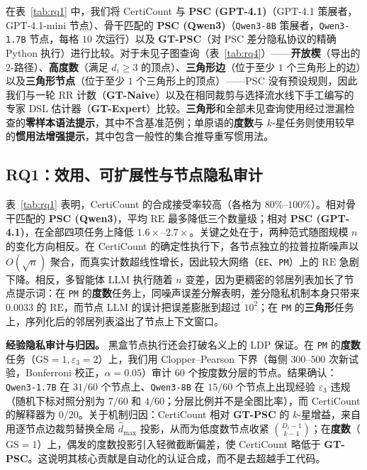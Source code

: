 \documentclass[11pt]{article}
\newlength{\zhindent}
\newcommand{\parhead}[1]{\par\noindent\hspace*{\zhindent}\textbf{#1}}
\theoremstyle{ieeeitalic}
\newcommand{\GS}{\mathrm{GS}}
\newcommand{\dhatmax}{\hat{d}_{\max}}
\newcommand{\RE}{\mathrm{RE}}
\begin{document}
在表~\ref{tab:rq1} 中，我们将 CertiCount 与 \textbf{PSC (GPT-4.1)}\cite{zhang2026psc}（GPT-4.1 策展者，GPT-4.1-mini 节点）、骨干匹配的 \textbf{PSC (Qwen3)}（\texttt{Qwen3-8B} 策展者，\texttt{Qwen3-1.7B} 节点，每格 $10$ 次运行）以及 \textbf{GT-PSC}（对 PSC 差分隐私协议的精确 Python 执行）进行比较。对于未见子图查询（表~\ref{tab:rq4}）——\textbf{开放楔}（导出的 $2$-路径）、\textbf{高度数}（满足 $d_i \ge 3$ 的顶点）、\textbf{三角形边}（位于至少 $1$ 个三角形上的边）以及\textbf{三角形节点}（位于至少 $1$ 个三角形上的顶点）——PSC 没有预设规则，因此我们与一轮 RR 计数（\textbf{GT-Naive}）以及在相同裁剪与选择流水线下手工编写的专家 DSL 估计器（\textbf{GT-Expert}）比较。\textbf{三角形}和全部未见查询使用经过泄漏检查的\textbf{零样本语法提示}，其中不含基准范例；单原语的\textbf{度数}与 $k$-星任务则使用较早的\textbf{惯用法增强提示}，其中包含一般性的集合推导重写惯用法。

\subsection{RQ1：效用、可扩展性与节点隐私审计}
\label{sec:rq1}

表~\ref{tab:rq1} 表明，CertiCount 的合成接受率较高（各格为 $80\%$--$100\%$）。相对骨干匹配的 \textbf{PSC (Qwen3)}，平均 $\RE$ 最多降低三个数量级；相对 \textbf{PSC (GPT-4.1)}，在全部四项任务上降低 $1.6\times$--$2.7\times$。关键之处在于，两种范式随图规模 $n$ 的变化方向相反。在 CertiCount 的确定性执行下，各节点独立的拉普拉斯噪声以 $O(\sqrt{n})$ 聚合，而真实计数超线性增长，因此较大网络（\texttt{EE}、\texttt{PM}）上的 $\RE$ 急剧下降\cite{imola2021locally}。相反，多智能体 LLM 执行随着 $n$ 变差，因为更稠密的邻居列表加长了节点提示词：在 \texttt{PM} 的\textbf{度数}任务上，同噪声误差分解表明，差分隐私机制本身只带来 $0.0033$ 的 $\RE$，而节点 LLM 的误计把误差膨胀到超过 $10^2$；在 \texttt{PM} 的\textbf{三角形}任务上，序列化后的邻居列表溢出了节点上下文窗口。

\parhead{经验隐私审计与归因。}
黑盒节点执行还会打破名义上的 LDP 保证。在 \texttt{PM} 的\textbf{度数}任务（$\GS=1, \varepsilon_3=2$）上，我们用 Clopper--Pearson 下界\cite{jagielski2020auditing}（每侧 $300$--$500$ 次新试验，Bonferroni 校正，$\alpha=0.05$）审计 $60$ 个按度数分层的节点。结果确认：\texttt{Qwen3-1.7B} 在 $31/60$ 个节点上、\texttt{Qwen3-8B} 在 $15/60$ 个节点上出现经验 $\varepsilon_3$ 违规（随机下标对照分别为 $7/60$ 和 $4/60$；分层比例并不是全图比率），而 CertiCount 的解释器为 $0/20$。关于机制归因：CertiCount 相对 \textbf{GT-PSC} 的 $k$-星增益，来自用逐节点边裁剪\cite{imola2022communication}替换全局 $\dhatmax$ 投影，从而为低度数节点收紧 $\binom{D_i-1}{k-1}$；在\textbf{度数}（$\GS=1$）上，偶发的度数投影引入轻微截断偏差，使 CertiCount 略低于 \textbf{GT-PSC}。这说明其核心贡献是自动化的认证合成，而不是去超越手工代码。
\end{document}
